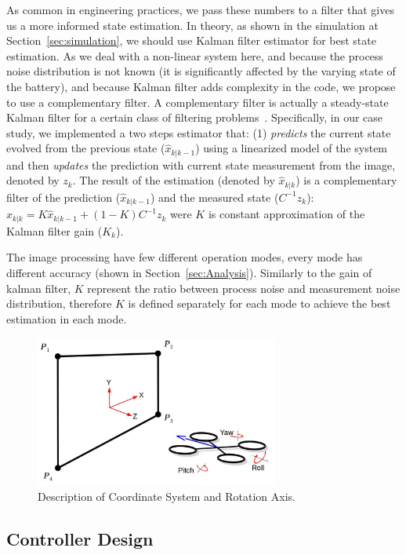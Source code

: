 \documentclass{sig-alternate-ipsn13}
\begin{document}
As common in engineering practices, we pass these numbers to a filter that gives us a more informed state estimation. 
In theory, as shown in the simulation at Section~\ref{sec:simulation}, we should use Kalman filter estimator for best state estimation. As we deal with a non-linear system here, and because the process noise distribution is not known (it is significantly affected by the varying state of the battery), and because Kalman filter adds complexity in the code, we propose to use a complementary filter.
A complementary filter is actually a steady-state Kalman filter for a certain class of filtering problems~\cite{complementaryVSKalman}.
Specifically, in our case study, we implemented a two steps estimator that: (1) \textit{predicts} the current state evolved from the previous state ($\hat{x}_{k|k-1}$) using a linearized model of the system and then \textit{updates} the prediction with current state measurement from the image, denoted by $z_k$.
The result of the estimation (denoted by $\hat{x}_{k|k}$) is a complementary filter of the prediction ($\hat{x}_{k|k-1}$) and the measured state ($C^{-1}z_k$):
$ \hat{x}_{k|k} = K \hat{x}_{k|k-1} + (1-K) C^{-1}z_k $ were $K$ is constant approximation of the Kalman filter gain ($K_k$).

The image processing have few different operation modes, every mode has different accuracy (shown in Section~\ref{sec:Analysis}).
Similarly to the gain of kalman filter, $K$ represent the ratio between process noise and measurement noise distribution, therefore $K$ is defined separately for each mode to achieve the best estimation in each mode.

\begin{figure}[htbp]
    \centerline{\includegraphics[width=80mm]{axis.jpg}}
    \caption{Description of Coordinate System and Rotation Axis.}
    \label{fig:axis}
\end{figure}


\subsection{Controller Design}
\end{document}

